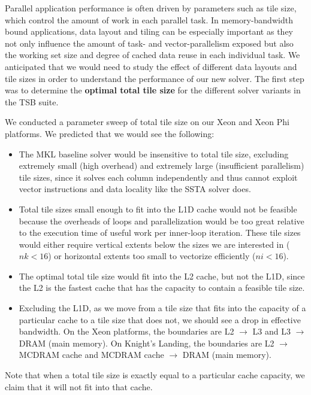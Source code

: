\documentclass[10pt, conference, compsocconf]{IEEEtran}
\begin{document}
Parallel application performance is often driven by parameters such as 
  tile size, which control the amount of work in each parallel task.
In memory-bandwidth bound applications, data layout and tiling can be
  especially important as they not only influence the amount of task- and
  vector-parallelism exposed but also the working set size and degree of cached
  data reuse in each individual task.
We anticipated that we would need to study the effect of different data layouts
  and tile sizes in order to understand the performance of our new solver.
The first step was to determine the \textbf{optimal total tile size} for the 
  different solver variants in the TSB suite.

We conducted a parameter sweep of total tile size on our Xeon and Xeon Phi 
  platforms.
We predicted that we would see the following: 
\begin{itemize}
\item The MKL baseline solver would be insensitive to total tile size, excluding
  extremely small (high overhead) and extremely large (insufficient parallelism)
  tile sizes, since it solves each column independently and thus cannot exploit
  vector instructions and data locality like the SSTA solver does.
\item Total tile sizes small enough to fit into the L1D cache would not be
  feasible because the overheads of loops and parallelization would be too great
  relative to the execution time of useful work per inner-loop iteration.
These tile sizes would either require vertical extents below the sizes 
  we are interested in (\(nk < 16\)) or horizontal
  extents too small to vectorize efficiently (\(ni < 16\)).
\item The optimal total tile size would fit into the L2 cache, but not the L1D,
  since the L2 is the fastest cache that has the capacity to contain a
  feasible tile size.
\item Excluding the L1D, as we move from a tile size that fits into the
  capacity of a particular cache to a tile size that does not, we should see a
  drop in effective bandwidth.
On the Xeon platforms, the boundaries are L2 \(\rightarrow\) L3 and L3
  \(\rightarrow\) DRAM (main memory).
On Knight's Landing, the boundaries are L2 \(\rightarrow\) MCDRAM cache and
  MCDRAM cache \(\rightarrow\) DRAM (main memory).
\end{itemize}
Note that when a total tile size is exactly equal to a particular cache
  capacity, we claim that it will not fit into that cache.
\end{document}
